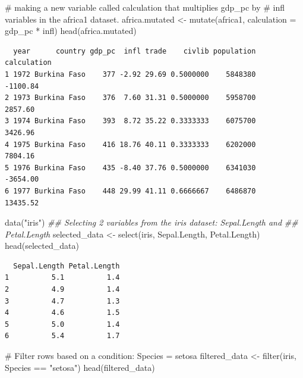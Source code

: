 \documentclass[
  letterpaper,
  DIV=11,
  numbers=noendperiod]{scrreprt}
\newenvironment{Shaded}{\begin{snugshade}}{\end{snugshade}}
\newcommand{\AttributeTok}[1]{\textcolor[rgb]{0.40,0.45,0.13}{#1}}
\newcommand{\CommentTok}[1]{\textcolor[rgb]{0.37,0.37,0.37}{#1}}
\newcommand{\DocumentationTok}[1]{\textcolor[rgb]{0.37,0.37,0.37}{\textit{#1}}}
\newcommand{\FunctionTok}[1]{\textcolor[rgb]{0.28,0.35,0.67}{#1}}
\newcommand{\NormalTok}[1]{\textcolor[rgb]{0.00,0.23,0.31}{#1}}
\newcommand{\OtherTok}[1]{\textcolor[rgb]{0.00,0.23,0.31}{#1}}
\newcommand{\SpecialCharTok}[1]{\textcolor[rgb]{0.37,0.37,0.37}{#1}}
\newcommand{\StringTok}[1]{\textcolor[rgb]{0.13,0.47,0.30}{#1}}
\begin{document}
\begin{Shaded}
\begin{Highlighting}[]
\CommentTok{\# making a new variable called calculation that multiplies gdp\_pc by}
\CommentTok{\# infl variables in the africa1 dataset.}
\NormalTok{africa.mutated }\OtherTok{\textless{}{-}} \FunctionTok{mutate}\NormalTok{(africa1, }\AttributeTok{calculation =}\NormalTok{ gdp\_pc }\SpecialCharTok{*}\NormalTok{ infl)}
\FunctionTok{head}\NormalTok{(africa.mutated)}
\end{Highlighting}
\end{Shaded}

\begin{verbatim}
  year      country gdp_pc  infl trade    civlib population calculation
1 1972 Burkina Faso    377 -2.92 29.69 0.5000000    5848380    -1100.84
2 1973 Burkina Faso    376  7.60 31.31 0.5000000    5958700     2857.60
3 1974 Burkina Faso    393  8.72 35.22 0.3333333    6075700     3426.96
4 1975 Burkina Faso    416 18.76 40.11 0.3333333    6202000     7804.16
5 1976 Burkina Faso    435 -8.40 37.76 0.5000000    6341030    -3654.00
6 1977 Burkina Faso    448 29.99 41.11 0.6666667    6486870    13435.52
\end{verbatim}

\begin{Shaded}
\begin{Highlighting}[]
\FunctionTok{data}\NormalTok{(}\StringTok{"iris"}\NormalTok{)}
\DocumentationTok{\#\# Selecting 2 variables from the iris dataset: Sepal.Length and}
\DocumentationTok{\#\# Petal.Length}
\NormalTok{selected\_data }\OtherTok{\textless{}{-}} \FunctionTok{select}\NormalTok{(iris, Sepal.Length, Petal.Length)}
\FunctionTok{head}\NormalTok{(selected\_data)}
\end{Highlighting}
\end{Shaded}

\begin{verbatim}
  Sepal.Length Petal.Length
1          5.1          1.4
2          4.9          1.4
3          4.7          1.3
4          4.6          1.5
5          5.0          1.4
6          5.4          1.7
\end{verbatim}

\begin{Shaded}
\begin{Highlighting}[]
\CommentTok{\# Filter rows based on a condition: Species = setosa}
\NormalTok{filtered\_data }\OtherTok{\textless{}{-}} \FunctionTok{filter}\NormalTok{(iris, Species }\SpecialCharTok{==} \StringTok{"setosa"}\NormalTok{)}
\FunctionTok{head}\NormalTok{(filtered\_data)}
\end{Highlighting}
\end{Shaded}
\end{document}
